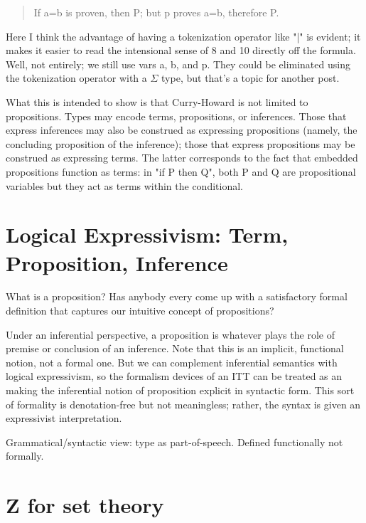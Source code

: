 \documentclass{article}
\begin{document}
\begin{quote}
    If a=b is proven, then P; but p proves a=b, therefore P.
\end{quote}

Here I think the advantage of having a tokenization operator like "|" is evident; it makes it easier to read the intensional sense of 8 and 10 directly off the formula.  Well, not entirely; we still use vars a, b, and p.   They could be eliminated using the tokenization operator with a \(\Sigma\) type, but that's a topic for another post.

What this is intended to show is that Curry-Howard is not limited to propositions.  Types may encode terms, propositions, or inferences.   Those that express inferences may also be construed as expressing propositions (namely, the concluding proposition of the inference); those that express propositions may be construed as expressing terms.  The latter corresponds to the fact that embedded propositions function as terms: in "if P then Q", both P and Q are propositional variables but they act as terms within the conditional.

\section{Logical Expressivism: Term, Proposition, Inference}

What is a proposition?  Has anybody every come up with a satisfactory
formal definition that captures our intuitive concept of propositions?

Under an inferential perspective, a proposition is whatever plays the
role of premise or conclusion of an inference.  Note that this is an
implicit, functional notion, not a formal one.  But we can complement
inferential semantics with logical expressivism, so the formalism
devices of an ITT can be treated as an making the inferential notion
of proposition explicit in syntactic form.  This sort of formality is
denotation-free but not meaningless; rather, the syntax is given an
expressivist interpretation.

Grammatical/syntactic view: type as part-of-speech.  Defined
functionally not formally.


\section{Z for set theory}
\end{document}
